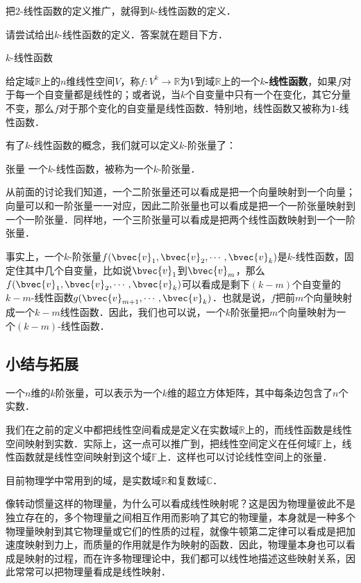 把$2$-线性函数的定义推广，就得到$k$-线性函数的定义．

\begin{exercise}{}
请尝试给出$k$-线性函数的定义．答案就在题目下方．
\end{exercise}

\begin{definition}{$k$-线性函数}

给定域$\mathbb{R}$上的$n$维线性空间$V$，称$f:V^k\rightarrow \mathbb{R}$为$V$到域$\mathbb{R}$上的一个\textbf{$k$-线性函数}，如果$f$对于每一个自变量都是线性的；或者说，当$k$个自变量中只有一个在变化，其它分量不变，那么$f$对于那个变化的自变量是线性函数．特别地，线性函数又被称为$1$-线性函数．

\end{definition}

有了$k$-线性函数的概念，我们就可以定义$k$-阶张量了：

\begin{definition}{张量}
一个$k$-线性函数，被称为一个$k$-阶张量．
\end{definition}

从前面的讨论我们知道，一个二阶张量还可以看成是把一个向量映射到一个向量；向量可以和一阶张量一一对应，因此二阶张量也可以看成是把一个一阶张量映射到一个一阶张量．同样地，一个三阶张量可以看成是把两个线性函数映射到一个一阶张量．

事实上，一个$k$-阶张量$f(\bvec{v}_1, \bvec{v}_2, \cdots,\bvec{v}_k)$是$k$-线性函数，固定住其中几个自变量，比如说$\bvec{v}_1$到$\bvec{v}_m$，那么$f(\bvec{v}_1, \bvec{v}_2,\cdots,\bvec{v}_k)$可以看成是剩下$(k-m)$个自变量的$k-m$-线性函数$g(\bvec{v}_{m+1}, \cdots,\bvec{v}_k)$．也就是说，$f$把前$m$个向量映射成一个$k-m$线性函数．因此，我们也可以说，一个$k$阶张量把$m$个向量映射为一个$(k-m)$-线性函数．

\subsection{小结与拓展}

一个$n$维的$k$阶张量，可以表示为一个$k$维的超立方体矩阵，其中每条边包含了$n$个实数．

我们在之前的定义中都把线性空间看成是定义在实数域$\mathbb{R}$上的，而线性函数是线性空间映射到实数．实际上，这一点可以推广到，把线性空间定义在任何域$\mathbb{F}$上，线性函数就是线性空间映射到这个域$\mathbb{F}$上．这样也可以讨论线性空间上的张量．

目前物理学中常用到的域，是实数域$\mathbb{R}$和复数域$\mathbb{C}$．

像转动惯量这样的物理量，为什么可以看成线性映射呢？这是因为物理量彼此不是独立存在的，多个物理量之间相互作用而影响了其它的物理量，本身就是一种多个物理量映射到其它物理量或它们的性质的过程，就像牛顿第二定律可以看成是把加速度映射到力上，而质量的作用就是作为映射的函数．因此，物理量本身也可以看成是映射的过程，而在许多物理理论中，我们都可以线性地描述这些映射关系，因此常常可以把物理量看成是线性映射．







